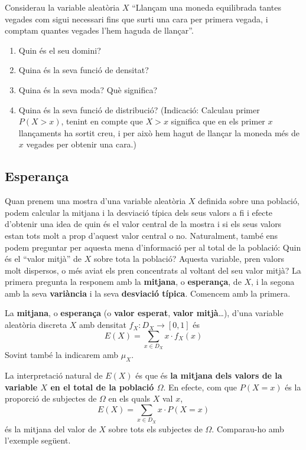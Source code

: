 \documentclass[
]{book}
\providecommand{\tightlist}{%
  \setlength{\itemsep}{0pt}\setlength{\parskip}{0pt}}
\theoremstyle{definition}
\theoremstyle{definition}
\theoremstyle{definition}
\theoremstyle{remark}
\begin{document}
\begin{rmdexercici}
Considerau la variable aleatòria \(X\) ``Llançam una moneda equilibrada tantes vegades com sigui necessari fins que surti una cara per primera vegada, i comptam quantes vegades l'hem haguda de llançar''.

\begin{enumerate}
\def\labelenumi{\arabic{enumi}.}
\tightlist
\item
  Quin és el seu domini?
\item
  Quina és la seva funció de densitat?
\item
  Quina és la seva moda? Què significa?
\item
  Quina és la seva funció de distribució? (Indicació: Calculau primer \(P(X>x)\), tenint en compte que \(X>x\) significa que en els primer \(x\) llançaments ha sortit creu, i per això hem hagut de llançar la moneda més de \(x\) vegades per obtenir una cara.)
\end{enumerate}
\end{rmdexercici}

\hypertarget{esperanuxe7a}{%
\subsection{Esperança}\label{esperanuxe7a}}

Quan prenem una mostra d'una variable aleatòria \(X\) definida sobre una població, podem calcular la mitjana i la desviació típica dels seus valors a fi i efecte d'obtenir una idea de quin és el valor central de la mostra i si els seus valors estan tots molt a prop d'aquest valor central o no. Naturalment, també ens podem preguntar per aquesta mena d'informació per al total de la població: Quin és el ``valor mitjà'' de \(X\) sobre tota la població? Aquesta variable, pren valors molt dispersos, o més aviat els pren concentrats al voltant del seu valor mitjà? La primera pregunta la responem amb la \textbf{mitjana}, o \textbf{esperança}, de \(X\), i la segona amb la seva \textbf{variància} i la seva \textbf{desviació típica}. Comencem amb la primera.

La \textbf{mitjana}, o \textbf{esperança} (o \textbf{valor esperat}, \textbf{valor mitjà}\ldots), d'una variable aleatòria discreta \(X\) amb densitat \(f_X:D_X\to [0,1]\) és
\[
E(X)=\sum_{x\in D_X} x\cdot f_X(x)
\]
Sovint també la indicarem amb \(\mu_X\).

La interpretació natural de \(E(X)\) és que és \textbf{la mitjana dels valors de la variable \(X\) en el total de la població \(\Omega\)}. En efecte, com que \(P(X=x)\) és la proporció de subjectes de \(\Omega\) en els quals \(X\) val \(x\),
\[
E(X)=\sum_{x\in D_X} x\cdot P(X=x)
\]
és la mitjana del valor de \(X\) sobre tots els subjectes de \(\Omega\). Comparau-ho amb l'exemple següent.
\end{document}
